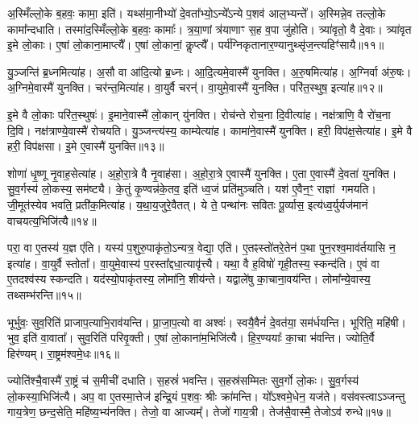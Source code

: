 अ॒स्मिँल्लो॒के ब॒हवः॒ कामा॒ इति॑।
यथ्स॑मा॒नीभ्यो॑ दे॒वता᳚भ्यो॒\-ऽन्ये᳚\-ऽन्ये प॒शव॑ आल॒भ्यन्ते᳚।
अ॒स्मिन्ने॒व तल्लो॒के कामा᳚न्दधाति।
तस्मा॑द॒स्मिँल्लो॒के ब॒हवः॒ कामाः᳚।
त्र॒या॒णां त्र॑याणाꣳ स॒ह व॒पा जु॑होति।
त्र्या॑वृतो॒ वै दे॒वाः।
त्र्या॑वृत इ॒मे लो॒काः।
ए॒षां लो॒काना॒माप्त्यै᳚।
ए॒षां लो॒कानां॒ कॢप्त्यै᳚।
पर्य॑ग्निकृतानार॒ण्या\-नुथ्सृ॑ज॒न्त्यहिꣳ॑सायै॥११॥\ip\anuvakamend[अव॑रुद्ध्या उ॒भया᳚न्प॒शूनाल॑भते स॒त्यादहिꣳ॑सायै]

यु॒ञ्जन्ति॑ ब्र॒ध्नमित्या॑ह।
अ॒सौ वा आ॑दि॒त्यो ब्र॒ध्नः।
आ॒दि॒त्यमे॒वास्मै॑ युनक्ति।
अ॒रु॒षमित्या॑ह।
अ॒ग्निर्वा अ॑रु॒षः।
अ॒ग्निमे॒वास्मै॑ युनक्ति।
चर॑न्त॒मित्या॑ह।
वा॒युर्वै चरन्॑।
वा॒युमे॒वास्मै॑ युनक्ति।
परि॑त॒स्थुष॒ इत्या॑ह॥१२॥\ip

इ॒मे वै लो॒काः परि॑त॒स्थुषः॑।
इ॒माने॒वास्मै॑ लो॒कान् यु॑नक्ति।
रोच॑न्ते रोच॒ना दि॒वीत्या॑ह।
नक्ष॑त्राणि॒ वै रो॑च॒ना दि॒वि।
नक्ष॑त्राण्ये॒वास्मै॑ रोचयति।
यु॒ञ्जन्त्य॑स्य॒ काम्येत्या॑ह।
कामा॑ने॒वास्मै॑ युनक्ति।
हरी॒ विप॑क्ष॒सेत्या॑ह।
इ॒मे वै हरी॒ विप॑क्षसा।
इ॒मे ए॒वास्मै॑ युनक्ति॥१३॥\ip

शोणा॑ धृ॒ष्णू नृ॒वाह॒सेत्या॑ह।
अ॒हो॒रा॒त्रे वै नृ॒वाह॑सा।
अ॒हो॒रा॒त्रे ए॒वास्मै॑ युनक्ति।
ए॒ता ए॒वास्मै॑ दे॒वता॑ युनक्ति।
सु॒व॒र्गस्य॑ लो॒कस्य॒ सम॑ष्ट्यै।
के॒तुं कृ॒ण्वन्न॑के॒तव॒ इति॑ ध्व॒जं प्रति॑\-मुञ्चति।
यश॑ ए॒वैन॒ꣳ॒ राज्ञां गमयति।
जी॒मूत॑स्येव भवति॒ प्रती॑क॒मित्या॑ह।
य॒था॒\-य॒जु\-रे॒वै\-तत्।
ये ते॒ पन्था॑नः सवितः पू॒र्व्यास॒ इत्य॑ध्व॒र्युर्यज॑मानं वाचयत्य॒भिजि॑त्यै॥१४॥\ip

परा॒ वा ए॒तस्य॑ य॒ज्ञ ए॑ति।
यस्य॑ प॒शुरु॒पाकृ॑तो॒\-ऽन्यत्र॒ वेद्या॒ एति॑।
ए॒तꣴस्तो॑तरे॒तेन॑ प॒था पुन॒रश्व॒माव॑र्तयासि न॒ इत्या॑ह।
वा॒युर्वै स्तोता᳚।
वा॒युमे॒वास्य॑ प॒रस्ता᳚द्दधा॒त्यावृ॑त्त्यै।
यथा॒ वै ह॒विषो॑ गृही॒तस्य॒ स्कन्द॑ति।
ए॒वं वा ए॒तदश्व॑स्य स्कन्दति।
यद॑स्यो॒पाकृ॑तस्य॒ लोमा॑नि॒ शीय॑न्ते।
यद्वाले॑षु का॒चाना॒वय॑न्ति।
लोमा᳚न्ये॒वास्य॒ तथ्सम्भ॑रन्ति॥१५॥\ip

भूर्भुवः॒ सुव॒रिति॑ प्राजाप॒त्याभि॒राव॑यन्ति।
प्रा॒जा॒प॒त्यो वा अश्वः॑।
स्वयै॒वैनं॑ दे॒वत॑या॒ सम॑र्धयन्ति।
भूरिति॒ महि॑षी।
भुव॒ इति॑ वा॒वाता᳚।
सुव॒रिति॑ परिवृ॒क्ती।
ए॒षां लो॒काना॑म॒भिजि॑त्यै।
हि॒र॒ण्ययाः᳚ का॒चा भ॑वन्ति।
ज्योति॒र्वै हिर॑ण्यम्।
रा॒ष्ट्रम॑श्वमे॒धः॥१६॥\ip

ज्योति॑श्चै॒वास्मै॑ रा॒ष्ट्रं च॑ स॒मीची॑ दधाति।
स॒हस्रं॑ भवन्ति।
स॒हस्र॑सम्मितः सुव॒र्गो लो॒कः।
सु॒व॒र्गस्य॑ लो॒कस्या॒भिजि॑त्यै।
अप॒ वा ए॒तस्मा॒त्तेज॑ इन्द्रि॒यं प॒शवः॒ श्रीः क्रा॑मन्ति।
यो᳚ऽश्वमे॒धेन॒ यज॑ते।
वस॑वस्त्वा\-ऽञ्जन्तु गाय॒त्रेण॒ छन्द॒सेति॒ महि॑ष्य॒भ्य॑नक्ति।
तेजो॒ वा आज्यम्᳚।
तेजो॑ गाय॒त्री।
तेज॑सै॒वास्मै॒ तेजो\-ऽव॑ रुन्धे॥१७॥\ip

